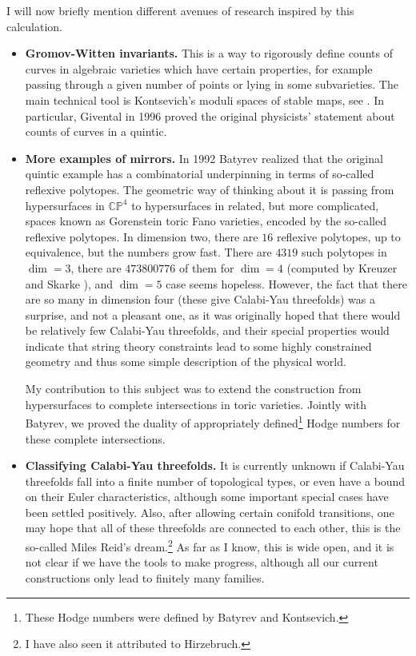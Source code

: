 \documentclass[11pt]{article}
\numberwithin{equation}{section}
\numberwithin{footnote}{section}
\newcommand{\blue}{\color{blue}}
\renewcommand{\P}{{\mathbb P}}
\newcommand{\C}{{\mathbb C}}
\begin{document}
\smallskip
I will now briefly mention different avenues of research inspired by this calculation.
\begin{itemize}
\item {\bf Gromov-Witten invariants.} This is a way to rigorously define counts of curves in algebraic varieties which have certain properties, for example passing through a given number of points or lying in some subvarieties. The main technical tool is Kontsevich's moduli spaces of stable maps, see \cite{Kontsevich,FP}. In particular, Givental in 1996 proved the original physicists' statement about counts of curves in a quintic.

\item {\bf More examples of mirrors.} In 1992 Batyrev \cite{Batyrev} realized that the original quintic example has a combinatorial underpinning in terms of so-called {\blue reflexive polytopes}. The geometric way of thinking about it is passing from hypersurfaces in $\C\P^4$ to hypersurfaces in related, but more complicated, spaces known as {\blue Gorenstein toric Fano varieties}, encoded by the so-called reflexive polytopes. In dimension two, there are $16$ reflexive polytopes, up to equivalence, but the numbers grow fast. There are $4319$ such polytopes in $\dim =3$, there are $473800776$ of them for $\dim =4$ (computed by Kreuzer and Skarke \cite{KS}), and $\dim =5$ case seems hopeless. However, the fact that there are so many in dimension four (these give Calabi-Yau threefolds) was a surprise, and not a pleasant one, as it was originally hoped that there would be relatively few Calabi-Yau threefolds, and their special properties would indicate that string theory constraints lead to some highly constrained geometry and thus some simple description of the physical world. 

\smallskip
My contribution to this subject was to extend the construction from hypersurfaces to {\blue complete intersections} in toric varieties. Jointly with Batyrev, we proved the duality of appropriately defined\footnote{ These  Hodge numbers were defined by Batyrev and Kontsevich.} Hodge numbers for these complete intersections.

\item{\bf Classifying Calabi-Yau threefolds.} It is currently unknown if Calabi-Yau threefolds fall into a finite number of topological types, or even have a bound on their Euler characteristics, although some important special cases have been settled positively. Also, after allowing certain {\blue conifold transitions}, one may hope that all of these threefolds are connected to each other, this is the so-called Miles Reid's dream.\footnote{ I have also seen it attributed to Hirzebruch.} As far as I know, this is wide open, and it is not clear if we have the tools to make progress, although all our current constructions only lead to finitely many families.


\end{itemize}
\end{document}
